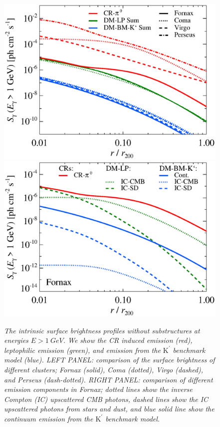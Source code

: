 \documentclass[10pt,aps,pra,reprint,amsmath,amsfonts,amssymb,showpacs,nofootinbib,floatfix]{revtex4-1}
\newcommand{\rmn}{\mathrm}
\newcommand{\Kp}{\rmn{K}^\prime}
\begin{document}
\begin{figure}
\begin{minipage}{2.0\columnwidth}
  \includegraphics[width=0.49\columnwidth]{figures/SB.v12.1GeV.SF300.noSuB.elmu.eps}
  \includegraphics[width=0.49\columnwidth]{figures/SB.fornax.v12.1GeV.SF300.noSuB.elmu.eps}
  \caption{\it The intrinsic surface brightness profiles without
    substructures at energies $E>1\ GeV$. We show the CR induced
    emission (red), leptophilic emission (green), and emission from
    the $\Kp$ benchmark model (blue).  LEFT PANEL: comparison of the surface
    brightness of different clusters; Fornax (solid), Coma (dotted),
    Virgo (dashed), and Perseus (dash-dotted). RIGHT PANEL: comparison of
    different emission components in Fornax; dotted lines show the
    inverse Compton (IC) upscattered CMB photons, dashed lines show
    the IC upscattered photons from stars and dust, and blue solid
    line show the continuum emission from the $\Kp$ benchmark model.}
 \label{fig:SB_clu_nosub}
\end{minipage}
\end{figure}
\end{document}

